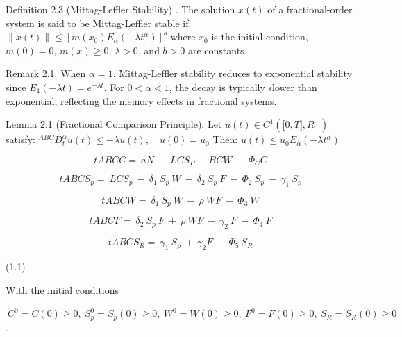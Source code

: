 \documentclass[10pt]{NSP1}
\begin{document}
\par\medskip{}\smallskip

Definition 2.3 (Mittag-Leffler Stability) \cite{ref7}. The solution \(x(t)\) of a fractional-order system is said to be Mittag-Leffler stable if: \(\parallel x(t) \parallel \leq \left\lbrack m\left( x_{0} \right)E_{\alpha}\left( - \lambda t^{\alpha} \right) \right\rbrack^{b}\) where \(x_{0}\) is the initial condition, \(m(0) = 0\), \(m(x) \geq 0\), \(\lambda > 0\), and \(b > 0\) are constants.

Remark 2.1. When \(\alpha = 1\), Mittag-Leffler stability reduces to exponential stability since \(E_{1}( - \lambda t) = e^{- \lambda t}\). For \(0 < \alpha < 1\), the decay is typically slower than exponential, reflecting the memory effects in fractional systems.

Lemma 2.1 (Fractional Comparison Principle). \cite{ref11} Let \(u(t) \in C^{1}\left( \lbrack 0,T\rbrack,R_{+} \right)\) satisfy: \(^{ABC}D_{t}^{\alpha}u(t) \leq - \lambda u(t),\quad u(0) = u_{0}\) Then: \(u(t) \leq u_{0}E_{\alpha}\left( - \lambda t^{\alpha} \right)\)

\par\medskip{}\smallskip

\par\medskip{}\smallskip

\[
tABCC = \ aN\ - \ LCS_{P} - \ BCW\ - \ \Phi_{C}C
\]

\[
tABCS_{p} = \ LCS_{p}\ - \ \delta_{1}\ S_{p}\ W\ - \ \delta_{2}\ S_{p}\ F\ - \ \Phi_{2}\ S_{p}\ - \ \gamma_{1}\ S_{p}
\]

\[
tABCW = \ \delta_{1}\ S_{p}\ W\ - \ \rho\ WF\ - \ \Phi_{3}\ W
\]

\[
tABCF = \ \delta_{2}\ S_{p}\ F\ + \ \rho\ WF\ - \ \gamma_{2}\ F\ - \ \Phi_{4}\ F
\]

\[
tABCS_{R} = \ \gamma_{1}\ S_{p}\ + \ \gamma_{2}F\ - \ \Phi_{5}\ S_{R}
\]

(1.1)

With the initial conditions

\({\ C}^{0} = C(0) \geq 0,\ S_{p}^{0} = S_{p}(0) \geq 0,\ W^{0} = W(0) \geq 0,\ F^{0} = F(0) \geq 0,\ S_{R} = S_{R}(0) \geq 0\).
\end{document}
